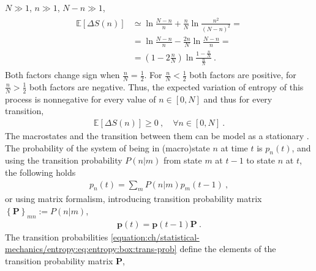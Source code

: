 \documentclass[letterpaper,10pt,english]{jupyterBook}
\begin{document}
\sphinxAtStartPar
{} \(N \gg 1\), \(n \gg 1\), \(N-n \gg 1\),
\begin{equation*}
\begin{split}\begin{aligned}
  \mathbb{E}\left[ \Delta S(n) \right] 
  & \simeq \ln \frac{N-n}{n} + \frac{n}{N} \ln \frac{n^2}{(N-n)^2} = \\
  & =      \ln \frac{N-n}{n} - \frac{2n}{N} \ln \frac{N-n}{n} = \\
  & =      \left( 1 - 2 \frac{n}{N} \right) \ln \frac{1 - \frac{n}{N}}{\frac{n}{N}} \ .
\end{aligned}\end{split}
\end{equation*}
\sphinxAtStartPar
Both factors change sign when \(\frac{n}{N} = \frac{1}{2}\). For \(\frac{n}{N} < \frac{1}{2}\) both factors are positive, for \(\frac{n}{N} > \frac{1}{2}\) both factors are negative. Thus, the expected variation of entropy of this process is non\sphinxhyphen{}negative for every value of \(n \in [0,N]\) and thus for every transition,
\begin{equation*}
\begin{split}\mathbb{E}\left[ \Delta S(n) \right] \ge 0 \ , \quad \forall n \in [0,N] \ .\end{split}
\end{equation*}
\sphinxAtStartPar
{} The macrostates and the transition between them can be model as a stationary . The probability of the system of being in (macro)state \(n\) at time \(t\) is \(p_n(t)\), and using the transition probability \(P(n|m)\) from state \(m\) at \(t-1\) to state \(n\) at \(t\), the following holds
\begin{equation*}
\begin{split}p_n(t) = \sum_{m} P(n|m) p_m(t-1) \ ,\end{split}
\end{equation*}
\sphinxAtStartPar
or using matrix formalism, introducing transition probability matrix \(\left\{\mathbf{P}\right\}_{mn} := P(n|m)\),
\begin{equation*}
\begin{split}\mathbf{p}(t) = \mathbf{p}(t-1) \mathbf{P} \ .\end{split}
\end{equation*}
\sphinxAtStartPar
The transition probabilities \eqref{equation:ch/statistical-mechanics/entropy:eq:entropy:box:trans-prob} define the elements of the transition probability matrix \(\mathbf{P}\),
\end{document}
